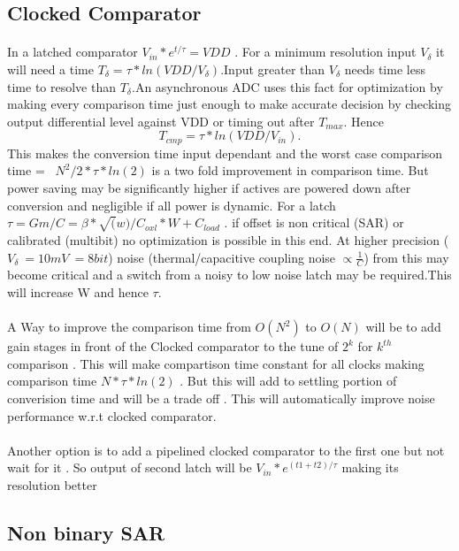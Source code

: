 \documentclass[a4paper,10pt,fleqn,titlepage,twoside]{article}
\begin{document}
\subsection{Clocked Comparator}
\paragraph{}
	In a latched comparator $V_{in}*e^{t/\tau}=VDD$ . For a minimum resolution input $V_{\delta}$ it will need a time $T_{\delta}  = \tau*ln(VDD/V_{\delta})
$.Input greater than $V_{\delta}$ needs time less time to resolve than $T_{\delta}$.An asynchronous ADC uses this fact for optimization by making every comparison time just enough to make
accurate decision by checking output differential level against VDD or timing out after $T_{max}$. Hence $$T_{cmp}=\tau*ln(VDD/V_{in}).$$ This makes the conversion time input dependant and the worst case
comparison time =~ $N^2/2*\tau*ln(2)$ is a two fold improvement in comparison time. But power saving may be significantly higher if actives are powered down after conversion and negligible if all power is dynamic.
For a latch $\tau = Gm/C = \beta*\sqrt(w)/C_{oxl}*W +C_{load}$ . if offset is non critical (SAR) or calibrated (multibit) no optimization is possible in this
end. At higher precision ($V_\delta~=10mV~=8bit$) noise (thermal/capacitive coupling noise $\propto \frac{1}{C}$) from this may become critical and a switch from a noisy to low noise
latch may be required.This will increase W and hence $\tau$.
\paragraph{}
	A Way to improve the comparison time from $O(N^2)$ to $O(N)$ will be to add gain stages in front of the Clocked comparator to the tune of $2^k$ for $k^{th}$ comparison . This will make compartison time 
constant for all clocks making comparison time $N*\tau*ln(2)$ . But this will add to settling portion of converision time and will be a trade off . This will automatically improve noise performance w.r.t clocked comparator.
\paragraph{}
Another option is to add a pipelined clocked comparator to the first one but not wait for it . So output of second latch will be $V_{in}*e^{(t1+t2)/\tau}$ making its resolution better 

\newpage
\subsection*{Non binary SAR}
\end{document}
